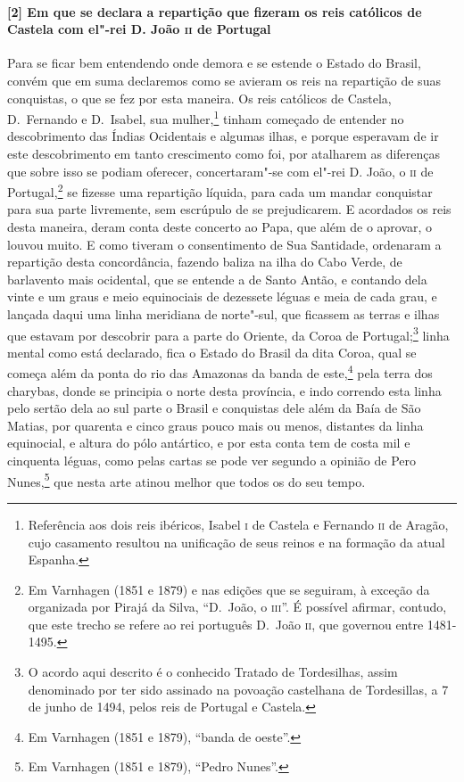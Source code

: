 \paragraph{[2] Em que se declara a repartição que fizeram os reis católicos de Castela com
el"-rei D. João \textsc{ii} de Portugal} \quad
Para se ficar bem entendendo onde demora e se estende o Estado do Brasil, convém que em
suma declaremos como se avieram os reis na repartição de suas conquistas, o que se fez por
esta maneira. Os reis católicos de Castela, D.~Fernando e D.~Isabel, sua mulher,\footnote{
Referência aos dois reis ibéricos, Isabel \textsc{i} de Castela e Fernando \textsc{ii} de
Aragão, cujo casamento resultou na unificação de seus reinos e na formação da atual
Espanha.} tinham começado de entender no descobrimento das Índias Ocidentais e algumas
ilhas, e porque esperavam de ir este descobrimento em tanto crescimento como foi, por
atalharem as diferenças que sobre isso se podiam oferecer, concertaram"-se com el"-rei D.
João, o \textsc{ii} de Portugal,\footnote{ Em Varnhagen (1851 e 1879) e nas edições que se
seguiram, à exceção da organizada por Pirajá da Silva, ``D.~João, o \textsc{iii}''. É
possível afirmar, contudo, que este trecho se refere ao rei português D.~João \textsc{ii},
que governou entre 1481-1495.} se fizesse uma repartição líquida, para cada um mandar
conquistar para sua parte livremente, sem escrúpulo de se prejudicarem. E acordados os
reis desta maneira, deram conta deste concerto ao Papa, que além de o aprovar, o louvou
muito. E como tiveram o consentimento de Sua Santidade, ordenaram a repartição desta
concordância, fazendo baliza na ilha do Cabo Verde, de barlavento mais ocidental, que se
entende a de Santo Antão, e contando dela vinte e um graus e meio equinociais de dezessete
léguas e meia de cada grau, e lançada daqui uma linha meridiana de norte"-sul, que ficassem
as terras e ilhas que estavam por descobrir para a parte do Oriente, da Coroa de
Portugal;\footnote{ O acordo aqui descrito é o conhecido Tratado de Tordesilhas, assim
denominado por ter sido assinado na povoação castelhana de Tordesillas, a 7 de junho de
1494, pelos reis de Portugal e Castela.} linha mental como está declarado, fica o Estado
do Brasil da dita Coroa, qual se começa além da ponta do rio das Amazonas da banda de
este,\footnote{ Em Varnhagen (1851 e 1879), ``banda de oeste''.} pela terra dos charybas, donde se principia o norte desta província, e indo
correndo esta linha pelo sertão dela ao sul parte o Brasil e conquistas dele além da Baía
de São Matias, por quarenta e cinco graus pouco mais ou menos, distantes da linha
equinocial, e altura do pólo antártico, e por esta conta tem de costa mil e cinquenta
léguas, como pelas cartas se pode ver segundo a opinião de Pero Nunes,\footnote{ Em
Varnhagen (1851 e 1879), ``Pedro Nunes''.} que nesta arte atinou melhor que todos os do
seu tempo.


